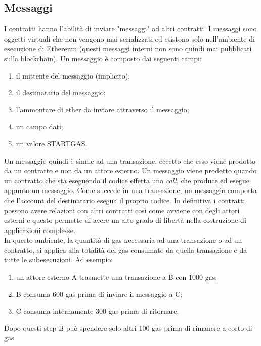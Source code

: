 \subsection{Messaggi}
%
I contratti hanno l'abilità di inviare "messaggi" ad altri contratti. I messaggi sono oggetti virtuali che non vengono mai serializzati ed esistono solo nell'ambiente di esecuzione di Ethereum (questi messaggi interni non sono quindi mai pubblicati sulla blockchain). Un messaggio è composto dai seguenti campi:
\begin{enumerate}
	\item il mittente del messaggio (implicito);
	\item il destinatario del messaggio;
	\item l'ammontare di ether da inviare attraverso il messaggio;
	\item un campo dati;
	\item un valore STARTGAS.
\end{enumerate}%
Un messaggio quindi è simile ad una transazione, eccetto che esso viene prodotto da un contratto e non da un attore esterno. Un messaggio viene prodotto quando un contratto che sta eseguendo il codice effetta una \emph{call}, che produce ed esegue appunto un messaggio. Come succede in una transazione, un messaggio comporta che l'account del destinatario esegua il proprio codice. In definitiva i contratti possono avere relazioni con altri contratti così come avviene con degli attori esterni e questo permette di avere un alto grado di libertà nella costruzione di applicazioni complesse. \\
In questo ambiente, la quantità di gas necessaria ad una transazione o ad un contratto, si applica alla totalità del gas consumato da quella transazione e da tutte le subesecuzioni. Ad esempio:
\begin{enumerate}
	\item un attore esterno A trasmette una transazione a B con 1000 gas;
	\item B consuma 600 gas prima di inviare il messaggio a C;
	\item C consuma internamente 300 gas prima di ritornare;
\end{enumerate}%
Dopo questi step B può spendere solo altri 100 gas prima di rimanere a corto di gas.
%
